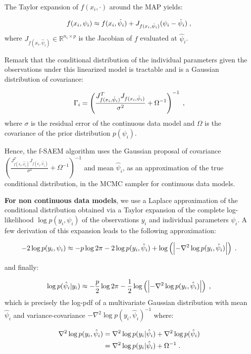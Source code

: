 The Taylor expansion of $f(x_{i},\cdot)$ around the MAP yields:

\begin{equation}
f(x_{i},\psi_i) \approx f(x_{i},\hat{\psi}_i) + J_{f(x_{i},\hat{\psi}_i)}(\psi_i - \hat{\psi}_i)\;,
\end{equation}
where $J_{f(x_{i},\hat{\psi}_i)} \in \mathbb{R}^{n_i \times p}$ is the Jacobian of $f$ evaluated at $\hat{\psi}_i$. 

Remark that the conditional distribution of the individual parameters given the observations under this linearized model is tractable and is a Gaussian distribution of covariance:


\begin{equation}
\Gamma_i =\left(\frac{ J_{f(x_{i},\hat{\psi}_i)}^T J_{f(x_{i},\hat{\psi}_i)} }{\sigma^2} + \Omega^{-1}\right)^{-1} \;,
\end{equation}
where $\sigma$ is the residual error of the continuous data model and $\Omega$ is the covariance of the prior distribution $p(\psi_i)$.

Hence, the f-SAEM algorithm uses the Gaussian proposal of covariance $\left(\frac{ J_{f(x_{i},\hat{\psi}_i)}^T J_{f(x_{i},\hat{\psi}_i)} }{\sigma^2} + \Omega^{-1}\right)^{-1}$ and  mean $\hat{\psi}_i$, as an approximation of the true conditional distribution, in the MCMC sampler for continuous data models.

\textbf{For non continuous data models}, we use a Laplace approximation of the conditional distribution obtained via a Taylor expansion of the complete log-likelihood $\log p(y_i,\psi_i)$ of the observations $y_i$ and individual parameters $\psi_i$.
A few derivation of this expansion leads to the following approximation:

$$
-2\log p(y_i,\psi_i)  \approx -p\log2\pi - 2\log p(y_i,\hat{\psi}_i) + \log \left(\left|-\nabla^2 \log p(y_i,\hat{\psi}_i)\right|\right)\;.
$$

and finally:

 $$
\log p(\hat{\psi}_i|y_i) \approx -\frac{p}{2}\log2\pi  -\frac{1}{2}\log \left(\left|-\nabla^2 \log p(y_i,\hat{\psi}_i) \right|\right)\;,
$$
which is precisely the log-pdf of a multivariate Gaussian distribution with mean $\hat{\psi}_i$ and  variance-covariance $-\nabla^2 \log p(y_i,\hat{\psi}_i)^{-1}$ where:

\begin{align}
\nabla^2 \log p(y_i,\hat{\psi}_i) &= \nabla^2 \log p(y_i|\hat{\psi}_i) + \nabla^2 \log p(\hat{\psi}_i) \\ \notag
&= \nabla^2 \log p(y_i|\hat{\psi}_i) + \Omega^{-1}\;.\notag
\end{align}

